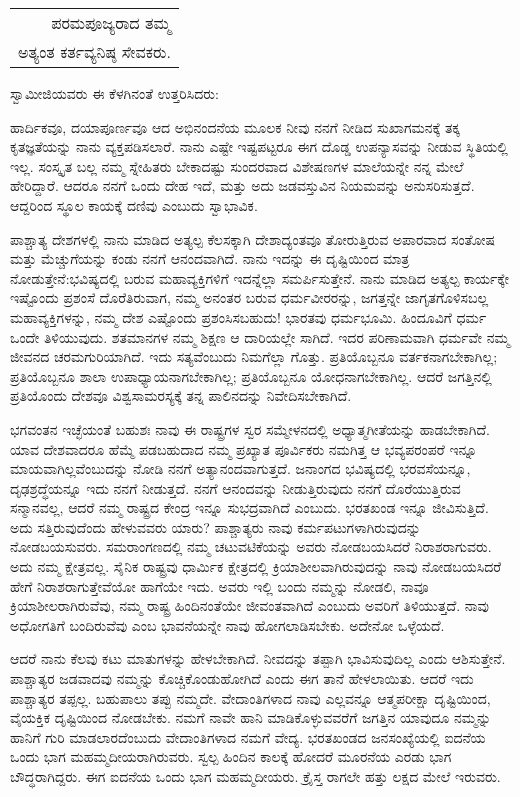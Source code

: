 \begin{longtable}[r]{@{}r@{}}
ಪರಮಪೂಜ್ಯರಾದ ತಮ್ಮ \\
ಅತ್ಯಂತ ಕರ್ತವ್ಯನಿಷ್ಠ ಸೇವಕರು. \\
\end{longtable}

ಸ್ವಾಮೀಜಿಯವರು ಈ ಕೆಳಗಿನಂತೆ ಉತ್ತರಿಸಿದರು:

ಹಾರ್ದಿಕವೂ, ದಯಾಪೂರ್ಣವೂ ಆದ ಅಭಿನಂದನೆಯ ಮೂಲಕ ನೀವು ನನಗೆ ನೀಡಿದ ಸುಖಾಗಮನಕ್ಕೆ ತಕ್ಕ ಕೃತಜ್ಞತೆಯನ್ನು ನಾನು ವ್ಯಕ್ತಪಡಿಸಲಾರೆ. ನಾನು ಎಷ್ಟೇ ಇಷ್ಟಪಟ್ಟರೂ ಈಗ ದೊಡ್ಡ ಉಪನ್ಯಾಸವನ್ನು ನೀಡುವ ಸ್ಥಿತಿಯಲ್ಲಿ ಇಲ್ಲ. ಸಂಸ್ಕೃತ ಬಲ್ಲ ನಮ್ಮ ಸ್ನೇಹಿತರು ಬೇಕಾದಷ್ಟು ಸುಂದರವಾದ ವಿಶೇಷಣಗಳ ಮಾಲೆಯನ್ನೇ ನನ್ನ ಮೇಲೆ ಹೇರಿದ್ದಾರೆ. ಆದರೂ ನನಗೆ ಒಂದು ದೇಹ ಇದೆ, ಮತ್ತು ಅದು ಜಡವಸ್ತುವಿನ ನಿಯಮವನ್ನು ಅನುಸರಿಸುತ್ತದೆ. ಆದ್ದರಿಂದ ಸ್ಥೂಲ ಕಾಯಕ್ಕೆ ದಣಿವು ಎಂಬುದು ಸ್ವಾಭಾವಿಕ. 

ಪಾಶ್ಚಾತ್ಯ ದೇಶಗಳಲ್ಲಿ ನಾನು ಮಾಡಿದ ಅತ್ಯಲ್ಪ ಕೆಲಸಕ್ಕಾಗಿ ದೇಶಾದ್ಯಂತವೂ ತೋರುತ್ತಿರುವ ಅಪಾರವಾದ ಸಂತೋಷ ಮತ್ತು ಮೆಚ್ಚುಗೆಯನ್ನು ಕಂಡು ನನಗೆ ಆನಂದವಾಗಿದೆ. ನಾನು ಇದನ್ನು ಈ ದೃಷ್ಟಿಯಿಂದ ಮಾತ್ರ ನೋಡುತ್ತೇನೆ:\break ಭವಿಷ್ಯದಲ್ಲಿ ಬರುವ ಮಹಾವ್ಯಕ್ತಿಗಳಿಗೆ ಇದನ್ನೆಲ್ಲಾ ಸಮರ್ಪಿಸುತ್ತೇನೆ. ನಾನು ಮಾಡಿದ ಅತ್ಯಲ್ಪ ಕಾರ್ಯಕ್ಕೇ ಇಷ್ಟೊಂದು ಪ್ರಶಂಸೆ ದೊರೆತಿರುವಾಗ, ನಮ್ಮ ಅನಂತರ ಬರುವ ಧರ್ಮವೀರರನ್ನು, ಜಗತ್ತನ್ನೇ ಜಾಗೃತಗೊಳಿಸಬಲ್ಲ ಮಹಾವ್ಯಕ್ತಿಗಳನ್ನು, ನಮ್ಮ ದೇಶ ಎಷ್ಟೊಂದು ಪ್ರಶಂಸಿಸಬಹುದು! ಭಾರತವು ಧರ್ಮಭೂಮಿ. ಹಿಂದೂವಿಗೆ ಧರ್ಮ ಒಂದೇ ತಿಳಿಯುವುದು. ಶತಮಾನಗಳ ನಮ್ಮ ಶಿಕ್ಷಣ ಆ ದಾರಿಯಲ್ಲೇ ಸಾಗಿದೆ. ಇದರ ಪರಿಣಾಮವಾಗಿ ಧರ್ಮವೇ ನಮ್ಮ ಜೀವನದ ಚರಮಗುರಿಯಾಗಿದೆ. ಇದು ಸತ್ಯವೆಂಬುದು ನಿಮಗೆಲ್ಲಾ ಗೊತ್ತು. ಪ್ರತಿಯೊಬ್ಬನೂ ವರ್ತಕನಾಗಬೇಕಾಗಿಲ್ಲ; ಪ್ರತಿಯೊಬ್ಬನೂ ಶಾಲಾ ಉಪಾಧ್ಯಾಯನಾಗಬೇಕಾಗಿಲ್ಲ; ಪ್ರತಿಯೊಬ್ಬನೂ ಯೋಧನಾಗಬೇಕಾಗಿಲ್ಲ. ಆದರೆ ಜಗತ್ತಿನಲ್ಲಿ ಪ್ರತಿಯೊಂದು ದೇಶವೂ ವಿಶ್ವಸಾಮರಸ್ಯಕ್ಕೆ ತನ್ನ ಪಾಲಿನದನ್ನು ನಿವೇದಿಸಬೇಕಾಗಿದೆ. 

ಭಗವಂತನ ಇಚ್ಛೆಯಂತೆ ಬಹುಶಃ ನಾವು ಈ ರಾಷ್ಟ್ರಗಳ ಸ್ವರ ಸಮ್ಮೇಳನದಲ್ಲಿ ಅಧ್ಯಾತ್ಮಗೀತೆಯನ್ನು ಹಾಡಬೇಕಾಗಿದೆ. ಯಾವ ದೇಶವಾದರೂ ಹೆಮ್ಮೆ ಪಡಬಹುದಾದ ನಮ್ಮ ಪ್ರಖ್ಯಾತ ಪೂರ್ವಿಕರು ನಮಗಿತ್ತ ಆ ಭವ್ಯಪರಂಪರೆ ಇನ್ನೂ ಮಾಯವಾಗಿಲ್ಲವೆಂಬುದನ್ನು ನೋಡಿ ನನಗೆ ಅತ್ಯಾನಂದವಾಗುತ್ತದೆ. ಜನಾಂಗದ ಭವಿಷ್ಯದಲ್ಲಿ ಭರವಸೆಯನ್ನೂ, ದೃಢಶ್ರದ್ಧೆಯನ್ನೂ ಇದು ನನಗೆ ನೀಡುತ್ತದೆ. ನನಗೆ ಆನಂದವನ್ನು ನೀಡುತ್ತಿರುವುದು ನನಗೆ ದೊರೆಯುತ್ತಿರುವ ಸನ್ಮಾನವಲ್ಲ, ಆದರೆ ನಮ್ಮ ರಾಷ್ಟ್ರದ ಕೇಂದ್ರ ಇನ್ನೂ ಸುಭದ್ರವಾಗಿದೆ ಎಂಬುದು. ಭರತಖಂಡ ಇನ್ನೂ ಜೀವಿಸುತ್ತಿದೆ. ಅದು ಸತ್ತಿರುವುದೆಂದು ಹೇಳುವವರು ಯಾರು? ಪಾಶ್ಚಾತ್ಯರು ನಾವು ಕರ್ಮಪಟುಗಳಾಗಿರುವುದನ್ನು ನೋಡಬಯಸುವರು. ಸಮರಾಂಗಣದಲ್ಲಿ ನಮ್ಮ ಚಟುವಟಿಕೆಯನ್ನು ಅವರು ನೋಡಬಯಸಿದರೆ ನಿರಾಶರಾಗುವರು. ಅದು ನಮ್ಮ ಕ್ಷೇತ್ರವಲ್ಲ. ಸೈನಿಕ ರಾಷ್ಟ್ರವು ಧಾರ್ಮಿಕ ಕ್ಷೇತ್ರದಲ್ಲಿ ಕ್ರಿಯಾಶೀಲವಾಗಿರುವುದನ್ನು ನಾವು ನೋಡಬಯಸಿದರೆ ಹೇಗೆ ನಿರಾಶರಾಗುತ್ತೇವೆಯೋ ಹಾಗೆಯೇ ಇದು. ಅವರು ಇಲ್ಲಿ ಬಂದು ನಮ್ಮನ್ನು ನೋಡಲಿ, ನಾವೂ ಕ್ರಿಯಾಶೀಲರಾಗಿರುವೆವು, ನಮ್ಮ ರಾಷ್ಟ್ರ ಹಿಂದಿನಂತೆಯೇ ಜೀವಂತವಾಗಿದೆ ಎಂಬುದು ಅವರಿಗೆ ತಿಳಿಯುತ್ತದೆ. ನಾವು ಅಧೋಗತಿಗೆ ಬಂದಿರುವೆವು ಎಂಬ ಭಾವನೆಯನ್ನೇ ನಾವು ಹೋಗಲಾಡಿಸಬೇಕು. ಅದೇನೋ ಒಳ್ಳೆಯದೆ. 

ಆದರೆ ನಾನು ಕೆಲವು ಕಟು ಮಾತುಗಳನ್ನು ಹೇಳಬೇಕಾಗಿದೆ. ನೀವದನ್ನು ತಪ್ಪಾಗಿ ಭಾವಿಸುವುದಿಲ್ಲ ಎಂದು ಆಶಿಸುತ್ತೇನೆ. ಪಾಶ್ಚಾತ್ಯರ ಜಡವಾದವು ನಮ್ಮನ್ನು ಕೊಚ್ಚಿಕೊಂಡುಹೋಗಿದೆ ಎಂದು ಈಗ ತಾನೆ ಹೇಳಲಾಯಿತು. ಆದರೆ ಇದು ಪಾಶ್ಚಾತ್ಯರ ತಪ್ಪಲ್ಲ. ಬಹುಪಾಲು ತಪ್ಪು ನಮ್ಮದೇ. ವೇದಾಂತಿಗಳಾದ ನಾವು ಎಲ್ಲವನ್ನೂ ಆತ್ಮಪರೀಕ್ಷಾ ದೃಷ್ಟಿಯಿಂದ, ವೈಯಕ್ತಿಕ ದೃಷ್ಟಿಯಿಂದ ನೋಡಬೇಕು. ನಮಗೆ ನಾವೇ ಹಾನಿ ಮಾಡಿಕೊಳ್ಳುವವರೆಗೆ ಜಗತ್ತಿನ ಯಾವುದೂ ನಮ್ಮನ್ನು ಹಾನಿಗೆ ಗುರಿ ಮಾಡಲಾರದೆಂಬುದು ವೇದಾಂತಿಗಳಾದ ನಮಗೆ ವೇದ್ಯ. ಭರತಖಂಡದ ಜನಸಂಖ್ಯೆಯಲ್ಲಿ ಐದನೆಯ ಒಂದು ಭಾಗ ಮಹಮ್ಮದೀಯರಾಗಿರುವರು. ಸ್ವಲ್ಪ ಹಿಂದಿನ ಕಾಲಕ್ಕೆ ಹೋದರೆ ಮೂರನೆಯ ಎರಡು ಭಾಗ ಬೌದ್ಧರಾಗಿದ್ದರು. ಈಗ ಐದನೆಯ ಒಂದು ಭಾಗ ಮಹಮ್ಮದೀಯರು. ಕ್ರೈಸ್ತ ರಾಗಲೇ ಹತ್ತು ಲಕ್ಷದ ಮೇಲೆ ಇರುವರು. 

